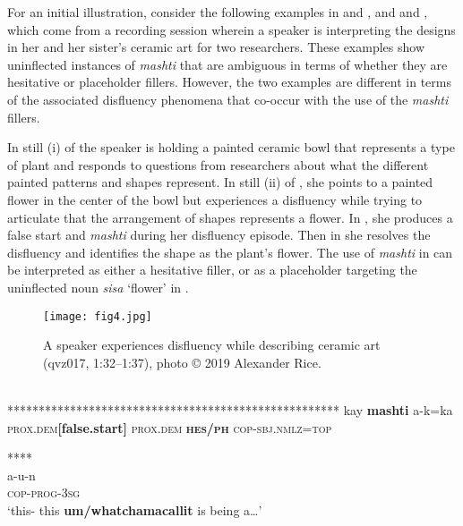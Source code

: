 \documentclass[output=paper]{langscibook}
\begin{document}
For an initial illustration, consider the following examples in  and , and  and , which come from a recording session wherein a speaker is interpreting the designs in her and her sister’s ceramic art for two researchers. These examples show uninflected instances of \textit{mashti} that are ambiguous in terms of whether they are hesitative or placeholder fillers. However, the two examples are different in terms of the associated disfluency phenomena that co-occur with the use of the \textit{mashti} fillers.  

In still (i) of  the speaker is holding a painted ceramic bowl that represents a type of plant and responds to questions from researchers about what the different painted patterns and shapes represent. In still (ii) of , she points to a painted flower in the center of the bowl but experiences a disfluency while trying to articulate that the arrangement of shapes represents a flower. In , she produces a false start and \textit{mashti} during her disfluency episode. Then in  she resolves the disfluency and identifies the shape as the plant’s flower. The use of \textit{mashti} in  can be interpreted as either a hesitative filler, or as a placeholder targeting the uninflected noun \textit{sisa} ‘flower’ in .

  
\begin{figure}
\texttt{[image: fig4.jpg]}
\caption{\label{fig:rice:4} A speaker experiences disfluency while describing ceramic art (qvz017, 1:32--1:37), photo © 2019 Alexander Rice.}
\end{figure}


\ea%
\label{ex:rice:20}
\ea \label{ex:rice:20a}
\\
\glt******************************************************
 {kay} {\textbf{mashti}} {a-k=ka} \\
{{\textsc{prox.dem}}{\textbf{[false.start]}}} {\textsc{prox.dem}}  {\textbf{\textsc{hes/ph}}} {\textsc{cop-sbj.nmlz=top}} \\
\medskip

\glll*****\\
{a-u-n}\\
{\textsc{cop-prog-3sg}}\\
\glt ‘this- this \textbf{um/whatchamacallit} is being a…’\\
\medskip
\end{document}
